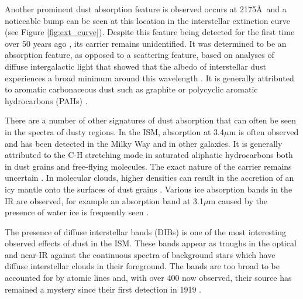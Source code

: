 Another prominent dust absorption feature  is observed occurs at 2175\AA\ and a noticeable bump can be seen at this location in the interstellar extinction curve (see Figure \ref{fig:ext_curve}).  Despite this feature being detected for the first time over 50 years ago \citep{Stecher1965}, its carrier remains unidentified.  It was determined to be an absorption feature, as opposed to a scattering feature, based on analyses of diffuse intergalactic light that showed that the albedo of interstellar dust experiences a broad minimum around this wavelength \citep{Lillie1976,Witt1982,Witt1986}.  It is generally attributed to aromatic carbonaceous dust such as graphite \citep{Stecher1965a} or polycyclic aromatic hydrocarbons (PAHs) \citep{Joblin1992,Li2001}.

There are a number of other signatures of dust absorption that can often be seen in  the spectra of dusty regions.  In the ISM, absorption at 3.4$\mu$m is often observed and has been detected in the Milky Way and in other galaxies.  It is generally attributed to the C-H stretching mode in saturated aliphatic hydrocarbons both in dust grains and free-flying molecules.  The exact nature of the carrier remains uncertain \citep{Pendleton2002}. In molecular clouds, higher densities can result in the accretion of an icy mantle onto the surfaces of dust grains \citep{Schutte1997}.  Various ice absorption bands in the IR are observed, for example an absorption band at 3.1$\mu$m caused by the presence of water ice is frequently seen \citep{Ehrenfreund2000}.

The presence of diffuse interstellar bands (DIBs) is one of the most interesting observed effects of dust in the ISM.  These bands appear as troughs in the optical and near-IR against the continuous spectra of background stars which have diffuse interstellar clouds in their foreground.  The bands are too broad to be accounted for by atomic lines and, with over 400 now observed, their source has remained a mystery since their first detection in 1919 \citep{Heger1922,Hobbs2008,Hobbs2009}.




